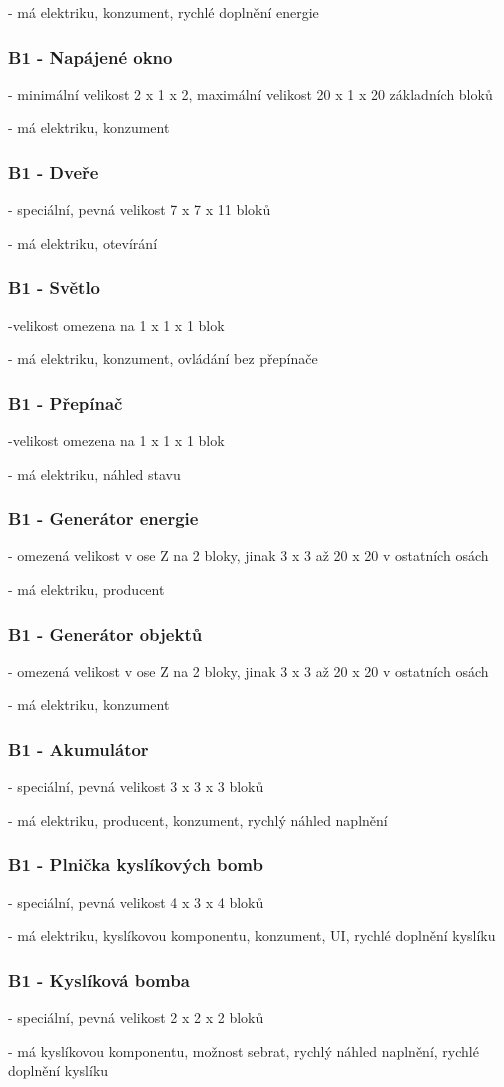 - má elektriku, konzument, rychlé doplnění energie
\subsubsection{B1 - Napájené okno}
- minimální velikost 2 x 1 x 2, maximální velikost 20 x 1 x 20 základních bloků

- má elektriku, konzument
\subsubsection{B1 - Dveře}
- speciální, pevná velikost 7 x 7 x 11 bloků

- má elektriku, otevírání
\subsubsection{B1 - Světlo}
-velikost omezena na 1 x 1 x 1 blok

- má elektriku, konzument, ovládání bez přepínače
\subsubsection{B1 - Přepínač}
-velikost omezena na 1 x 1 x 1 blok

- má elektriku, náhled stavu
\subsubsection{B1 - Generátor energie}
- omezená velikost v ose Z na 2 bloky, jinak 3 x 3 až 20 x 20 v ostatních osách

- má elektriku, producent
\subsubsection{B1 - Generátor objektů}
- omezená velikost v ose Z na 2 bloky, jinak 3 x 3 až 20 x 20 v ostatních osách

- má elektriku, konzument
\subsubsection{B1 - Akumulátor}
- speciální, pevná velikost 3 x 3 x 3 bloků

- má elektriku, producent, konzument, rychlý náhled naplnění
\subsubsection{B1 - Plnička kyslíkových bomb}
- speciální, pevná velikost 4 x 3 x 4 bloků

- má elektriku, kyslíkovou komponentu, konzument, UI, rychlé doplnění kyslíku

\subsubsection{B1 - Kyslíková bomba}
- speciální, pevná velikost 2 x 2 x 2 bloků

- má kyslíkovou komponentu, možnost sebrat, rychlý náhled naplnění, rychlé doplnění kyslíku


